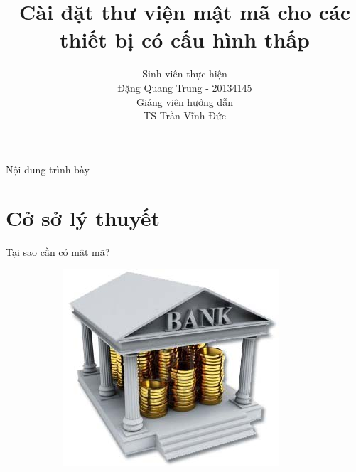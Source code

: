 \documentclass[compress]{beamer}
\title[Cài đặt thư viện mật mã cho các thiết bị có cấu hình thấp]{Cài đặt thư viện mật mã cho các thiết bị có cấu hình thấp}
\author[Đặng Quang Trung]{
Sinh viên thực hiện\\
Đặng Quang Trung - 20134145 \\[1em]
Giảng viên hướng dẫn\\
TS Trần Vĩnh Đức}
\begin{document}
\begin{frame}[plain]
\titlepage
\end{frame}

\begin{frame}[plain]{Nội dung trình bày}
\tableofcontents
\end{frame}

\section{Cở sở lý thuyết}
\begin{frame}{Tại sao cần có mật mã?}
\begin{figure}[h]
\begin{subfigure}{.35\textwidth}
  \centering
  \includegraphics[width=1\linewidth]{../bank.jpg}
  \label{fig:sfig1}
\end{subfigure}%
\begin{subfigure}{.35\textwidth}
  \centering

\end{subfigure}
\end{figure}
\end{frame}
\end{document}
